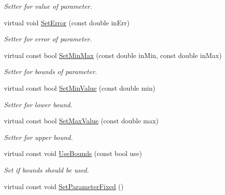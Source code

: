 \begin{DoxyCompactItemize}
\begin{DoxyCompactList}\small\item\em Setter for value of parameter. \end{DoxyCompactList}\item 
\hypertarget{class_double_parameter_a11e0436e045f24facdc4ad990ea6bd01}{virtual void \hyperlink{class_double_parameter_a11e0436e045f24facdc4ad990ea6bd01}{Set\-Error} (const double in\-Err)}\label{class_double_parameter_a11e0436e045f24facdc4ad990ea6bd01}

\begin{DoxyCompactList}\small\item\em Setter for error of parameter. \end{DoxyCompactList}\item 
\hypertarget{class_double_parameter_a73d2efdbb0b9e4acb58bd1d20199b20d}{virtual const bool \hyperlink{class_double_parameter_a73d2efdbb0b9e4acb58bd1d20199b20d}{Set\-Min\-Max} (const double in\-Min, const double in\-Max)}\label{class_double_parameter_a73d2efdbb0b9e4acb58bd1d20199b20d}

\begin{DoxyCompactList}\small\item\em Setter for bounds of parameter. \end{DoxyCompactList}\item 
virtual const bool \hyperlink{class_double_parameter_afaf1cd16a7f078e31c61c36f71bebee9}{Set\-Min\-Value} (const double min)
\begin{DoxyCompactList}\small\item\em Setter for lower bound. \end{DoxyCompactList}\item 
virtual const bool \hyperlink{class_double_parameter_ac59ca32f4cd78231d86d837b8d097162}{Set\-Max\-Value} (const double max)
\begin{DoxyCompactList}\small\item\em Setter for upper bound. \end{DoxyCompactList}\item 
\hypertarget{class_double_parameter_aa2ccfd3dff75080b249c2829b51c2aa4}{virtual const void \hyperlink{class_double_parameter_aa2ccfd3dff75080b249c2829b51c2aa4}{Use\-Bounds} (const bool use)}\label{class_double_parameter_aa2ccfd3dff75080b249c2829b51c2aa4}

\begin{DoxyCompactList}\small\item\em Set if bounds should be used. \end{DoxyCompactList}\item 
\hypertarget{class_double_parameter_a04634fceaa8029c1d267bd6c28c788fe}{virtual const void \hyperlink{class_double_parameter_a04634fceaa8029c1d267bd6c28c788fe}{Set\-Parameter\-Fixed} ()}\label{class_double_parameter_a04634fceaa8029c1d267bd6c28c788fe}


\end{DoxyCompactItemize}
